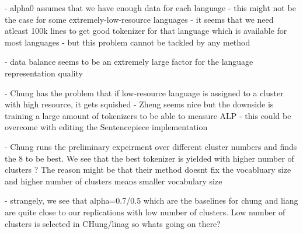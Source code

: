 
- alpha0 assumes that we have enough data for each language
    - this might not be the case for some extremely-low-resource languages
    - it seems that we need atleast 100k lines to get good tokenizer for that language which is available for most languages
    - but this problem cannot be tackled by any method

- data balance seems to be an extremely large factor for the language representation quality

- Chung has the problem that if low-resource language is assigned to a cluster with high resource, it gets squished
- Zheng seems nice but the downside is training a large amount of tokenizers to be able to measure ALP - this could be overcome with editing the Sentencepiece implementation

- Chung runs the preliminary expeirment over different cluster numbers and finds the 8 to be best. We see that the best tokenizer is yielded with higher number of clusters ? The reason might be that their method doesnt fix the vocabluary size and higher number of clusters means smaller vocabulary size

- strangely, we see that alpha=0.7/0.5 which are the baselines for chung and liang are quite close to our replications with low number of clusters. Low number of clusters is selected in CHung/linag so whats going on there?

